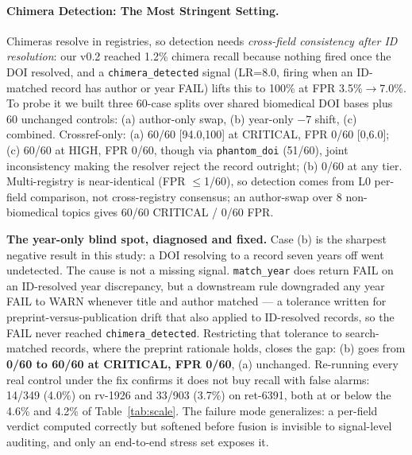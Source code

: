 \documentclass[runningheads]{llncs}
\begin{document}
\paragraph{Chimera Detection: The Most Stringent Setting.} Chimeras resolve in registries, so detection needs \emph{cross-field consistency after ID resolution}: our v0.2 reached 1.2\% chimera recall because nothing fired once the DOI resolved, and a \texttt{chimera\_\allowbreak detected} signal (LR=8.0, firing when an ID-matched record has author or year FAIL) lifts this to 100\% at FPR 3.5\%$\to$7.0\%. To probe it we built three 60-case splits over shared biomedical DOI bases plus 60 unchanged controls: (a) author-only swap, (b) year-only $-7$ shift, (c) combined. Crossref-only: (a) 60/60 [94.0,100] at CRITICAL, FPR 0/60 [0,6.0]; (c) 60/60 at HIGH, FPR 0/60, though via \texttt{phantom\_doi} (51/60), joint inconsistency making the resolver reject the record outright; (b) 0/60 at any tier. Multi-registry is near-identical (FPR $\leq$1/60), so detection comes from L0 per-field comparison, not cross-registry consensus; an author-swap over 8 non-biomedical topics gives 60/60 CRITICAL / 0/60 FPR.

\noindent\textbf{The year-only blind spot, diagnosed and fixed.} Case (b) is the sharpest negative result in this study: a DOI resolving to a record seven years off went undetected. The cause is not a missing signal. \texttt{match\_year} does return FAIL on an ID-resolved year discrepancy, but a downstream rule downgraded any year FAIL to WARN whenever title and author matched --- a tolerance written for preprint-versus-publication drift that also applied to ID-resolved records, so the FAIL never reached \texttt{chimera\_detected}. Restricting that tolerance to search-matched records, where the preprint rationale holds, closes the gap: (b) goes from \textbf{0/60 to 60/60 at CRITICAL, FPR 0/60}, (a) unchanged. Re-running every real control under the fix confirms it does not buy recall with false alarms: 14/349 (4.0\%) on rv-1926 and 33/903 (3.7\%) on ret-6391, both at or below the 4.6\% and 4.2\% of Table~\ref{tab:scale}. The failure mode generalizes: a per-field verdict computed correctly but softened before fusion is invisible to signal-level auditing, and only an end-to-end stress set exposes it.
\end{document}
